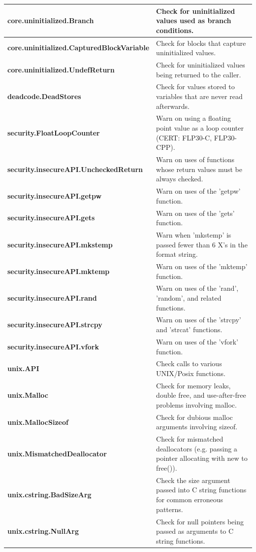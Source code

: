 {\begin{longtable}{||p{}|p{}||}
    \hline
    \textbf{core.uninitialized.Branch}
& Check for uninitialized values used as branch conditions.
    \\
    \hline
    \textbf{core.uninitialized.CapturedBlockVariable}
& Check for blocks that capture uninitialized values.
    \\
    \hline
    \textbf{core.uninitialized.UndefReturn}
& Check for uninitialized values being returned to the caller.
    \\
    \hline
    \textbf{deadcode.DeadStores}
& Check for values stored to variables that are never read afterwards.
    \\
    \hline
    \textbf{security.FloatLoopCounter}
& Warn on using a floating point value as a loop counter (CERT: FLP30-C, FLP30-CPP).
    \\
    \hline
    \textbf{security.insecureAPI.UncheckedReturn}
& Warn on uses of functions whose return values must be always checked.
    \\
    \hline
    \textbf{security.insecureAPI.getpw}
& Warn on uses of the 'getpw' function.
    \\
    \hline
    \textbf{security.insecureAPI.gets}
& Warn on uses of the 'gets' function.
    \\
    \hline
    \textbf{security.insecureAPI.mkstemp}
& Warn when 'mkstemp' is passed fewer than 6 X's in the format string.
    \\
    \hline
    \textbf{security.insecureAPI.mktemp}
& Warn on uses of the 'mktemp' function.
    \\
    \hline
    \textbf{security.insecureAPI.rand}
& Warn on uses of the 'rand', 'random', and related functions.
    \\
    \hline
    \textbf{security.insecureAPI.strcpy}
& Warn on uses of the 'strcpy' and 'strcat' functions.
    \\
    \hline
    \textbf{security.insecureAPI.vfork}
& Warn on uses of the 'vfork' function.
    \\
    \hline
    \textbf{unix.API}
& Check calls to various UNIX/Posix functions.
    \\
    \hline
    \textbf{unix.Malloc}
& Check for memory leaks, double free, and use-after-free problems involving malloc.
    \\
    \hline
    \textbf{unix.MallocSizeof}
& Check for dubious malloc arguments involving sizeof.
    \\
    \hline
    \textbf{unix.MismatchedDeallocator}
& Check for mismatched deallocators (e.g. passing a pointer allocating with new to free()).
    \\
    \hline
    \textbf{unix.cstring.BadSizeArg}
& Check the size argument passed into C string functions for common erroneous patterns.
    \\
    \hline
    \textbf{unix.cstring.NullArg}
& Check for null pointers being passed as arguments to C string functions.
    \\
    \hline
\end{longtable}}


